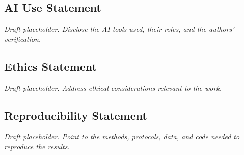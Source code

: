 
\subsection*{AI Use Statement}
\emph{Draft placeholder. Disclose the AI tools used, their roles, and the authors' verification.}

\subsection*{Ethics Statement}
\emph{Draft placeholder. Address ethical considerations relevant to the work.}

\subsection*{Reproducibility Statement}
\emph{Draft placeholder. Point to the methods, protocols, data, and code needed to reproduce the results.}
